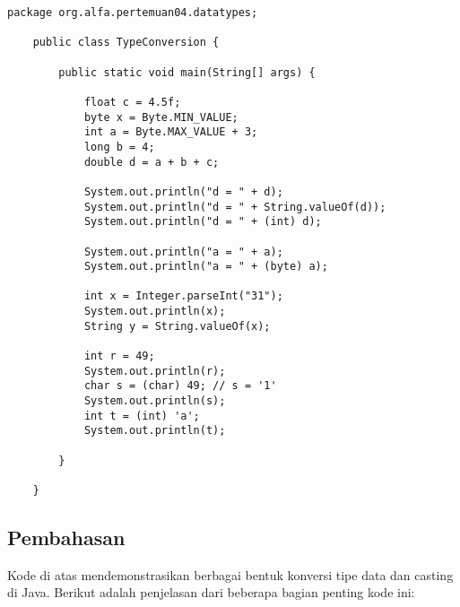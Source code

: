 \begin{lstlisting}[style=JavaStyle, caption={Java Code for Type Conversion and Casting}]
	package org.alfa.pertemuan04.datatypes;
	
	public class TypeConversion {
		
		public static void main(String[] args) {
			
			float c = 4.5f;
			byte x = Byte.MIN_VALUE;
			int a = Byte.MAX_VALUE + 3;
			long b = 4;
			double d = a + b + c;
			
			System.out.println("d = " + d);
			System.out.println("d = " + String.valueOf(d));
			System.out.println("d = " + (int) d);
			
			System.out.println("a = " + a);
			System.out.println("a = " + (byte) a);
			
			int x = Integer.parseInt("31");
			System.out.println(x);
			String y = String.valueOf(x);
			
			int r = 49;
			System.out.println(r);
			char s = (char) 49; // s = '1' 
			System.out.println(s);
			int t = (int) 'a'; 
			System.out.println(t);
			
		}
		
	}
\end{lstlisting}

\subsection{Pembahasan}
Kode di atas mendemonstrasikan berbagai bentuk konversi tipe data dan casting di Java. Berikut adalah penjelasan dari beberapa bagian penting kode ini:

